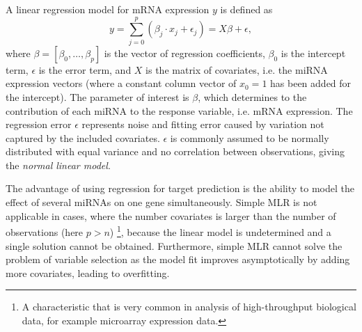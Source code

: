 A linear regression model for mRNA expression $y$ is defined as
\begin{equation}
  \label{eq:linear-regression}
	y = \sum_{j=0}^{p} (\beta_j \cdot x_j + \epsilon_{j}) =  X \beta + \epsilon,
\end{equation}
where $\beta = [\beta_0, \ldots, \beta_p]$ is the vector of regression coefficients,
$\beta_0$ is the intercept term, $\epsilon$ is the error term, and $X$ is the
matrix of covariates, i.e. the miRNA expression vectors (where a constant column
vector of $x_0=1$ has been added for the intercept). The parameter of
interest is $\beta$, which determines to the contribution of each miRNA to the
response variable, i.e. mRNA expression. The regression error $\epsilon$
represents noise and fitting error caused by variation not captured by the
included covariates. $\epsilon$ is commonly assumed to be normally
distributed with equal variance and no correlation between observations,
giving the \emph{normal linear model}.

The advantage of using regression for target prediction is the ability to
model the effect of several miRNAs on one gene simultaneously.
Simple MLR is not applicable in cases, where the number covariates is larger
than the number of observations (here $p > n$)
\footnote{A characteristic that is very common
in analysis of high-throughput biological data, for example microarray
expression data.}, because the linear model is
undetermined and a single solution cannot be obtained.
Furthermore, simple MLR cannot solve the problem of
variable selection as the model fit improves asymptotically
by adding more covariates, leading to overfitting.

